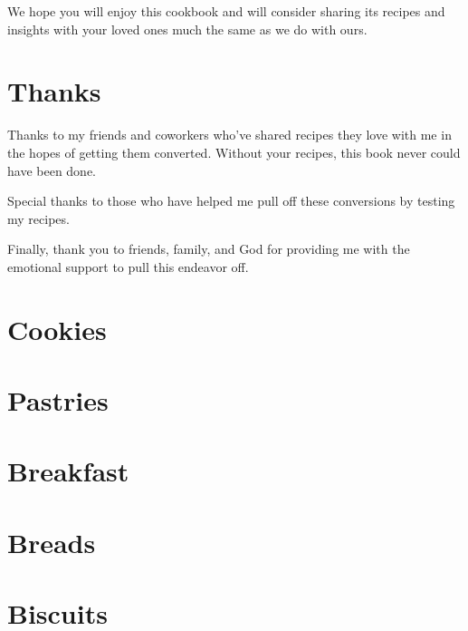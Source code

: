 \documentclass[titlepage]{article}
\begin{document}
\noindent We hope you will enjoy this cookbook and will consider sharing its recipes and insights with your loved ones much the same as we do with ours.
\section*{Thanks}
Thanks to my friends and coworkers who've shared recipes they love with me in the hopes of getting them converted. Without your recipes, this book never could have been done.
\vspace{\baselineskip}

\noindent Special thanks to those who have helped me pull off these conversions by testing my recipes.
\vspace{\baselineskip}

\noindent Finally, thank you to friends, family, and God for providing me with the emotional support to pull this endeavor off.
\pagebreak
\section{Cookies}
\section{Pastries}
\section{Breakfast}
\section{Breads}
\section{Biscuits}
\end{document}
